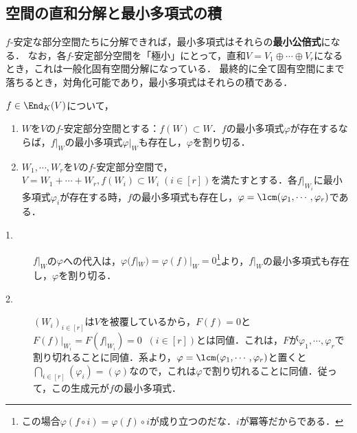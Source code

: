 \documentclass[uplatex, dvipdfmx]{jsreport}
\begin{document}
\subsection{空間の直和分解と最小多項式の積}

\begin{tcolorbox}[colframe=ForestGreen, colback=ForestGreen!10!white, breakable]
    $f$-安定な部分空間たちに分解できれば，最小多項式はそれらの\textbf{最小公倍式}になる．
    なお，各$f$-安定部分空間を「極小」にとって，直和$V=V_1\oplus\cdots\oplus V_r$になるとき，これは一般化固有空間分解になっている．
    最終的に全て固有空間にまで落ちるとき，対角化可能であり，最小多項式はそれらの積である．
\end{tcolorbox}

\begin{proposition}[最小公倍式としての最小多項式]\label{prop-algorithm-for-minimal-polynomials-in-the-terms-of-ideal}
    $f\in\End_K(V)$について，
    \begin{enumerate}
        \item $W$を$V$の$f$-安定部分空間とする：$f(W)\subset W$．$f$の最小多項式$\varphi$が存在するならば，$f|_W$の最小多項式$\varphi|_W$も存在し，$\varphi$を割り切る．
        \item $W_1,\cdots,W_r$を$V$の$f$-安定部分空間で，$V=W_1+\cdots+W_r, f(W_i)\subset W_i\;(i\in[r])$を満たすとする．各$f|_{W_i}$に最小多項式$\varphi_i$が存在する時，$f$の最小多項式も存在し，$\varphi=\lcm(\varphi_1,\cdots,\varphi_r)$である．
    \end{enumerate}
\end{proposition}
\begin{Proof}\mbox{}
    \begin{description}
        \item[1.] $f|_W$の$\varphi$への代入は，$\varphi(f|_W)=\varphi(f)|_W=0$\footnote{この場合$\varphi(f\circ i)=\varphi(f)\circ i$が成り立つのだな．$i$が冪等だからである．}より，$f|_W$の最小多項式も存在し，$\varphi$を割り切る．
        \item[2.] $(W_i)_{i\in[r]}$は$V$を被覆しているから，$F(f)=0$と$F(f)|_{W_i}=F(f|_{W_i})=0\;\;(i\in[r])$とは同値．これは，$F$が$\varphi_1,\cdots,\varphi_r$で割り切れることに同値．系より，$\varphi=\lcm(\varphi_1,\cdots,\varphi_r)$と置くと$\bigcap_{i\in[r]}(\varphi_i)=(\varphi)$なので，これは$\varphi$で割り切れることに同値．従って，この生成元が$f$の最小多項式．
    \end{description}
\end{Proof}
\end{document}
